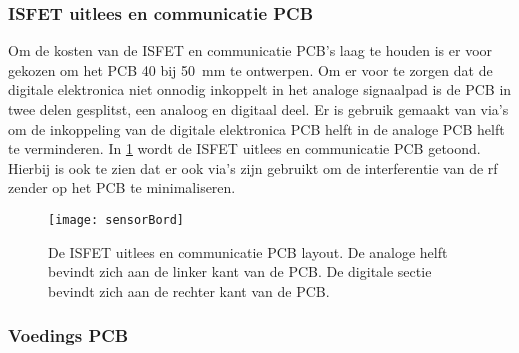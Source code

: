 \subsubsection{ISFET uitlees en communicatie PCB}
Om de kosten van de ISFET en communicatie PCB's laag te houden is er voor gekozen om het PCB 40 bij \qty{50}{\milli\meter} te ontwerpen. Om er voor te zorgen dat de digitale elektronica niet onnodig inkoppelt in het analoge signaalpad is de PCB in twee delen gesplitst, een analoog en digitaal deel. Er is gebruik gemaakt van via's om de inkoppeling van de digitale elektronica PCB helft in de analoge PCB helft te verminderen. In \cref{fig:sensorPCB} wordt de ISFET uitlees en communicatie PCB getoond. Hierbij is ook te zien dat er ook via's zijn gebruikt om de interferentie van de rf zender op het PCB te minimaliseren.
\begin{figure}[!htbp]
    \centering
    \texttt{[image: sensorBord]}
    \caption{De ISFET uitlees en communicatie PCB layout. De analoge helft bevindt zich aan de linker kant van de PCB. De digitale sectie bevindt zich aan de rechter kant van de PCB.}
    \label{fig:sensorPCB}
\end{figure}

\subsubsection{Voedings PCB}

